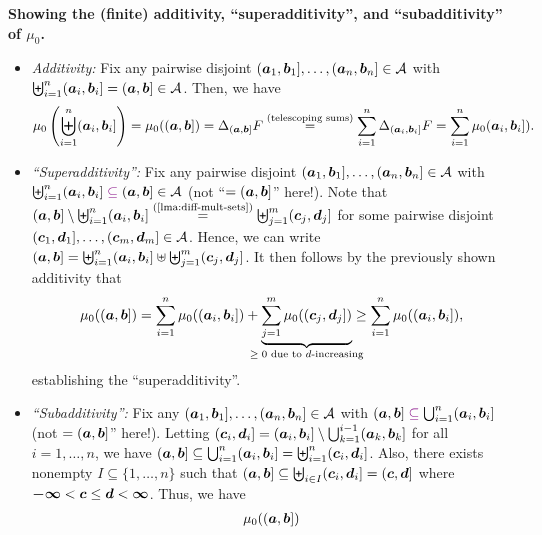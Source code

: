 \begin{enumerate}
\begin{pf}
\textbf{Showing the (finite) additivity, ``superadditivity'', and
``subadditivity'' of \(\mu_0\).}
\begin{itemize}
\item \emph{Additivity:} Fix any pairwise disjoint \((\bm{a}_1,\bm{b}_1]
,\dotsc,(\bm{a}_n,\bm{b}_n]\in\mathcal{A}\) with
\(\biguplus_{i=1}^{n}(\bm{a}_i,\bm{b}_i]=(\bm{a},\bm{b}]\in\mathcal{A}\).
Then, we have
\[
\mu_0\left(\biguplus_{i=1}^{n}(\bm{a}_i,\bm{b}_i]\right)
=\mu_0((\bm{a},\bm{b}])
=\Delta_{(\bm{a},\bm{b}]}F
\overset{\text{(telescoping sums)}}{=}\sum_{i=1}^{n}\Delta_{(\bm{a}_i,\bm{b}_i]}F
=\sum_{i=1}^{n}\mu_0(\bm{a}_i,\bm{b}_i]).
\]
\item \emph{``Superadditivity'':} Fix any pairwise disjoint \((\bm{a}_1,\bm{b}_1]
,\dotsc,(\bm{a}_n,\bm{b}_n]\in\mathcal{A}\) with
\(\biguplus_{i=1}^{n}(\vect{a}_i,\vect{b}_i]\vc{\subseteq} (\vect{a},\vect{b}]\in\mathcal{A}\)
(not ``\(=(\bm{a},\bm{b}]\)'' here!).
Note that \((\vect{a},\vect{b}]\setminus \biguplus_{i=1}^{n}(\vect{a}_i,\vect{b}_i]
\overset{\text{(\Cref{lma:diff-mult-sets})}}{=}
\biguplus_{j=1}^{m}(\vect{c}_j,\vect{d}_j]\)
for some pairwise disjoint
\((\bm{c}_1,\bm{d}_1],\dotsc,(\bm{c}_m,\bm{d}_m]\in\mathcal{A}\).
Hence, we can write \((\bm{a},\bm{b}]=\biguplus_{i=1}^{n}(\bm{a}_i,\bm{b}_i]
\uplus\biguplus_{j=1}^{m}(\bm{c}_j,\bm{d}_j]\). It then follows by the
previously shown additivity that
\[
\mu_0((\vect{a},\vect{b}])
=\sum_{i=1}^{n}\mu_0((\vect{a}_i,\vect{b}_i])
+\underbrace{\sum_{j=1}^{m}\mu_0((\vect{c}_j,\vect{d}_j])}_{\mathclap{\text{\(\ge 0\) due to \(d\)-increasing}}}
\ge\sum_{i=1}^{n}\mu_0((\vect{a}_i,\vect{b}_i]),
\]
establishing the ``superadditivity''.
\item \emph{``Subadditivity'':} Fix any
\((\bm{a}_1,\bm{b}_1],\dotsc,(\bm{a}_n,\bm{b}_n]\in\mathcal{A}\) with
\((\vect{a},\vect{b}]\vc{\subseteq} \bigcup_{i=1}^{n}(\vect{a}_i,\vect{b}_i]\)
(not \(=(\bm{a},\bm{b}]\)'' here!).
Letting \((\bm{c}_i,\bm{d}_i]=(\bm{a}_i,\bm{b}_i]\setminus
\bigcup_{k=1}^{i-1}(\bm{a}_k,\bm{b}_k]\) for all \(i=1,\dotsc,n\), we have
\((\bm{a},\bm{b}]\subseteq \bigcup_{i=1}^{n}(\bm{a}_i,\bm{b}_i]
=\biguplus_{i=1}^{n}(\bm{c}_i,\bm{d}_i]\). Also, there exists nonempty
\(I\subseteq \{1,\dotsc,n\}\) such that \((\bm{a},\bm{b}]\subseteq
\biguplus_{i\in I}^{}(\bm{c}_i,\bm{d}_i] =(\bm{c},\bm{d}]\)
where \(\bm{-\infty}<\bm{c}\le\bm{d}<\bm{\infty}\). Thus, we have
\begin{align*}
\mu_0((\vect{a},\vect{b}])

\end{align*}
\end{itemize}
\end{pf}
\end{enumerate}
